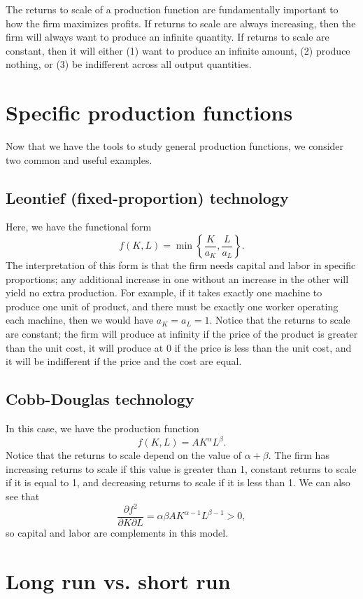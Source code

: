 The returns to scale of a production function are fundamentally important to how the firm maximizes profits. If returns to scale are always increasing, then the firm will always want to produce an infinite quantity. If returns to scale are constant, then it will either (1) want to produce an infinite amount, (2) produce nothing, or (3) be indifferent across all output quantities.

\section{Specific production functions}
Now that we have the tools to study general production functions, we consider two common and useful examples.

\subsection*{Leontief (fixed-proportion) technology}

Here, we have the functional form
$$f(K, L)=\min \left\{\frac{K}{a_{K}}, \frac{L}{a_{L}}\right\}.$$
The interpretation of this form is that the firm needs capital and labor in specific proportions; any additional increase in one without an increase in the other will yield no extra production. For example, if it takes exactly one machine to produce one unit of product, and there must be exactly one worker operating each machine, then we would have $a_K = a_L = 1$. Notice that the returns to scale are constant; the firm will produce at infinity if the price of the product is greater than the unit cost, it will produce at 0 if the price is less than the unit cost, and it will be indifferent if the price and the cost are equal.

\subsection*{Cobb-Douglas technology}

In this case, we have the production function
$$f(K, L) = AK^\alpha L^\beta.$$
Notice that the returns to scale depend on the value of $\alpha + \beta$. The firm has increasing returns to scale if this value is greater than 1, constant returns to scale if it is equal to 1, and decreasing returns to scale if it is less than 1. We can also see that
$$\frac{\partial f^2}{\partial K \partial L} = \alpha \beta AK^{\alpha - 1} L^{\beta -1} > 0,$$
so capital and labor are complements in this model. 

\section{Long run vs. short run}

